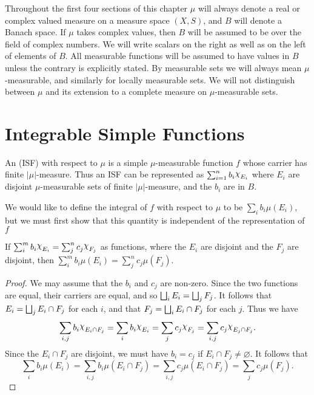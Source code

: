 

Throughout the first four sections of this chapter $\mu$ will always denote a real or complex valued measure on a measure space $(X,S)$, and $B$ will denote a Banach space. If $\mu$ takes complex values, then $B$ will be assumed to be over the field of complex numbers. We will write scalars on the right as well as on the left of elements of $B$. All measurable functions will be assumed to have values in $B$ unless the contrary is explicitly stated. By measurable sets we will always mean $\mu$-measurable, and similarly for locally measurable sets. We will not distinguish between $\mu$ and its extension to a complete measure on $\mu$-measurable sets.

\section{Integrable Simple Functions}

\begin{definition} 
An  (ISF) with respect to $\mu$ is a simple $\mu$-measurable function $f$ whose carrier has finite $|\mu|$-measure. Thus an ISF can be represented as $\sum_{i=1}^nb_i\idf{E_i}$ where $E_i$ are disjoint $\mu$-measurable sets of finite $|\mu|$-measure, and the $b_i$ are in $B$.
\end{definition}

We would like to define the integral of $f$ with respect to $\mu$ to be $\sum_ib_i\mu(E_i)$, but we must first show that this quantity is independent of the representation of $f$

\begin{lemma}
If $\sum_i^mb_i\idf{E_i}=\sum_j^nc_j\idf{F_j}$ as functions, where the $E_i$ are disjoint and the $F_j$ are disjoint, then $\sum_i^mb_i\mu(E_i)=\sum_j^nc_j\mu(F_j)$.
\end{lemma}

\begin{proof}
We may assume that the $b_i$ and $c_j$ are non-zero. Since the two functions are equal, their carriers are equal, and so $\bigsqcup_i E_i=\bigsqcup_j F_j$. It follows that $E_i=\bigsqcup_j E_i \cap F_j$ for each $i$, and that $F_j=\bigsqcup_iE_i \cap F_j$ for each $j$. Thus we have \[\sum_{i, j}b_i\idf{E_i \cap F_j}=\sum_i b_i\idf{E_i}=\sum_jc_j\idf{F_j}=\sum_{i, j} c_j\idf{E_j\cap F_j}.\] Since the $E_i \cap F_j$ are disjoint, we must have $b_i=c_j$ if $E_i \cap F_j \neq \varnothing$. It follows that \[\sum_ib_i\mu(E_i)=\sum_{i,j}b_i\mu(E_i\cap F_j)=\sum_{i,j}c_j\mu(E_i\cap F_j)=\sum_jc_j\mu(F_j).\]
\end{proof}


